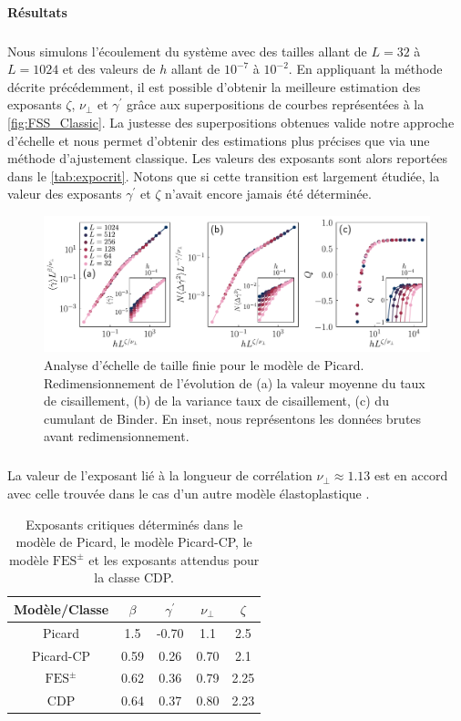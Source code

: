 \paragraph{Résultats}

\subparagraph{}Nous simulons l'écoulement du système avec des tailles allant de $L=32$ à $L=1024$ et des valeurs de $h$ allant de $10^{-7}$ à $10^{-2}$. En appliquant la méthode décrite précédemment, il est possible d'obtenir la meilleure estimation des exposants $\zeta$, $\nu_\perp$ et $\gamma^\prime$ grâce aux superpositions de courbes représentées à la \autoref{fig:FSS_Classic}. La justesse des superpositions obtenues valide notre approche d'échelle et  nous permet d'obtenir des estimations plus précises que via une méthode d'ajustement classique. Les valeurs des exposants sont alors reportées dans le \autoref{tab:expocrit}. Notons que si cette transition est largement étudiée, la valeur des exposants $\gamma^\prime$ et $\zeta$ n'avait encore jamais été déterminée.

\begin{figure}[h]
	\centering
	\includegraphics[width=\textwidth]{Chapitre4/Figures/CasPhysique/FSS_Classic_edited.pdf}
	\caption{Analyse d'échelle de taille finie pour le modèle de Picard. Redimensionnement de l'évolution de (a) la valeur moyenne du taux de cisaillement, (b) de la variance taux de cisaillement, (c) du cumulant de Binder. En inset, nous représentons les données brutes avant redimensionnement.}
	\label{fig:FSS_Classic}
\end{figure}

\subparagraph{}La valeur de l'exposant lié à la longueur de corrélation $\nu_\perp \approx 1.13$ est en accord avec celle trouvée dans le cas d'un autre modèle élastoplastique \cite{lin_scaling_2014}.

\begin{table}
\centering
\begin{tabular}{ccccc}
\hline \hline Modèle/Classe & $\beta$ & \multicolumn{1}{c}{$\gamma^{\prime}$} & $\nu_{\perp}$ & $\zeta$ \\
\hline Picard & 1.5 & -0.70 & 1.1 & 2.5 \\
Picard-CP & 0.59 & 0.26 & 0.70 & 2.1 \\
$\text{FES}^\pm$ & 0.62 & 0.36 & 0.79 & 2.25 \\
CDP \cite{lubeck_universal_2004} & 0.64 & 0.37 & 0.80 & 2.23 \\
\hline \hline
\end{tabular}
\caption{Exposants critiques déterminés dans le modèle de Picard, le modèle Picard-CP, le modèle $\text{FES}^\pm$ et les exposants attendus pour la classe CDP.}
\label{tab:expocrit}
\end{table}

